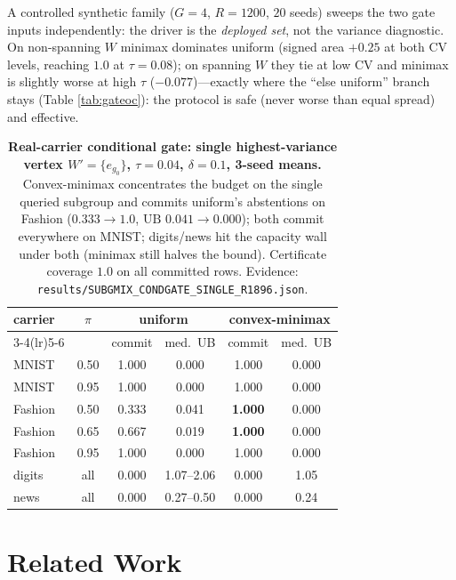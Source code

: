 \documentclass{article}
\begin{document}
A controlled synthetic family ($G{=}4$, $R{=}1200$, $20$ seeds) sweeps the two gate inputs
independently: the driver is the \emph{deployed set}, not the variance diagnostic. On
non-spanning $W$ minimax dominates uniform (signed area $+0.25$ at both CV levels, reaching
$1.0$ at $\tau{=}0.08$); on spanning $W$ they tie at low CV and minimax is slightly worse at
high $\tau$ ($-0.077$)---exactly where the ``else uniform'' branch stays (Table
\ref{tab:gateoc}): the protocol is safe (never worse than equal spread) and effective.
\begin{table}[t]
\centering\small\setlength{\tabcolsep}{4pt}
\begin{tabular}{lccccc}
\toprule
\multirow{2}{*}{carrier} & \multirow{2}{*}{$\pi$} &
  \multicolumn{2}{c}{uniform} & \multicolumn{2}{c}{convex-minimax} \\
\cmidrule(lr){3-4}\cmidrule(lr){5-6}
 & & commit & med.\ UB & commit & med.\ UB \\
\midrule
MNIST & 0.50 & 1.000 & 0.000 & 1.000 & 0.000 \\
MNIST & 0.95 & 1.000 & 0.000 & 1.000 & 0.000 \\
Fashion & 0.50 & 0.333 & 0.041 & \textbf{1.000} & 0.000 \\
Fashion & 0.65 & 0.667 & 0.019 & \textbf{1.000} & 0.000 \\
Fashion & 0.95 & 1.000 & 0.000 & 1.000 & 0.000 \\
digits & all & 0.000 & 1.07--2.06 & 0.000 & 1.05 \\
news & all & 0.000 & 0.27--0.50 & 0.000 & 0.24 \\
\bottomrule
\end{tabular}
\caption{\textbf{Real-carrier conditional gate: single highest-variance vertex
$W'=\{e_{g_0}\}$, $\tau{=}0.04$, $\delta{=}0.1$, 3-seed means.} Convex-minimax
concentrates the budget on the single queried subgroup and commits uniform's abstentions on
Fashion ($0.333\to1.0$, $\mathrm{UB}$ $0.041\to0.000$); both commit everywhere on MNIST;
digits/news hit the capacity wall under both (minimax still halves the bound). Certificate
coverage $1.0$ on all committed rows. Evidence:
\texttt{results/SUBGMIX\_CONDGATE\_SINGLE\_R1896.json}.}
\label{tab:m35gate}
\end{table}

\section{Related Work}
\label{sec:related}
\end{document}
